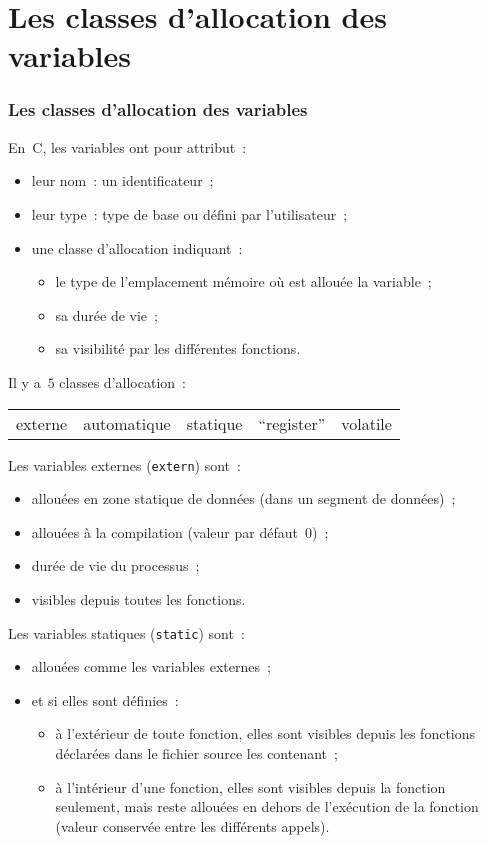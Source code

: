   \section{Les classes d'allocation des variables}%
\begin{frame}
  \frametitle{Les classes d'allocation des variables}%
 En~C, les variables ont pour attribut~:
  \begin{itemize}
  \item leur nom~: un identificateur~;
  \item leur type~: type de base ou d\'efini par l'utilisateur~;
  \item une classe d'allocation indiquant~: 
    \begin{itemize}
    \item le type de l'emplacement m\'emoire o\`u est allou\'ee la variable~;
    \item sa dur\'ee de vie~;
    \item sa visibilit\'e par les diff\'erentes fonctions.
    \end{itemize}
  \end{itemize}
  \par\bigskip
  Il y a~$5$ classes d'allocation~:
  \par
  \begin{center}
    \begin{tabular}{ccccc}
      externe & automatique & statique & ``register'' & volatile
    \end{tabular}
  \end{center}
\end{frame}
\begin{frame}
  Les variables externes ({\tt extern}) sont~: 
  \begin{itemize}
  \item allou\'ees en zone statique de donn\'ees (dans un segment de
    donn\'ees)~;
  \item allou\'ees \`a la compilation (valeur par d\'efaut~0)~;
  \item dur\'ee de vie du processus~;
  \item visibles depuis toutes les fonctions.
  \end{itemize}
  \par\bigskip
  Les variables statiques ({\tt static}) sont~:
  \begin{itemize}
  \item allou\'ees comme les variables externes~;
  \item et si elles sont d\'efinies~:
    \begin{itemize}
    \item \`a l'ext\'erieur de toute fonction, elles sont visibles
      depuis les fonctions d\'eclar\'ees dans le fichier source les
      contenant~;
    \item \`a l'int\'erieur d'une fonction, elles sont visibles
      depuis la fonction seulement, mais reste allou\'ees en dehors de
      l'ex\'ecution de la fonction (valeur conserv\'ee entre les diff\'erents appels).
    \end{itemize}
  \end{itemize}
\end{frame}
